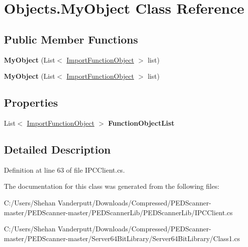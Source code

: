 \hypertarget{class_objects_1_1_my_object}{}\section{Objects.\+My\+Object Class Reference}
\label{class_objects_1_1_my_object}
\subsection*{Public Member Functions}
\begin{DoxyCompactItemize}
\item 
\mbox{\label{class_objects_1_1_my_object_a3b745d678a467607738e0a4b5d677e44}} 
{\bfseries My\+Object} (List$<$ \mbox{\hyperlink{class_objects_1_1_import_function_object}{Import\+Function\+Object}} $>$ list)
\item 
\mbox{\label{class_objects_1_1_my_object_a3b745d678a467607738e0a4b5d677e44}} 
{\bfseries My\+Object} (List$<$ \mbox{\hyperlink{class_objects_1_1_import_function_object}{Import\+Function\+Object}} $>$ list)
\end{DoxyCompactItemize}
\subsection*{Properties}
\begin{DoxyCompactItemize}
\item 
\mbox{\label{class_objects_1_1_my_object_a0af5a42cf0a47c368cd6a39bb3d6dcc8}} 
List$<$ \mbox{\hyperlink{class_objects_1_1_import_function_object}{Import\+Function\+Object}} $>$ {\bfseries Function\+Object\+List}
\end{DoxyCompactItemize}


\subsection{Detailed Description}


Definition at line 63 of file I\+P\+C\+Client.\+cs.



The documentation for this class was generated from the following files\+:\begin{DoxyCompactItemize}
\item 
C\+:/\+Users/\+Shehan Vanderputt/\+Downloads/\+Compressed/\+P\+E\+D\+Scanner-\/master/\+P\+E\+D\+Scanner-\/master/\+P\+E\+D\+Scanner\+Lib/\+P\+E\+D\+Scanner\+Lib/I\+P\+C\+Client.\+cs\item 
C\+:/\+Users/\+Shehan Vanderputt/\+Downloads/\+Compressed/\+P\+E\+D\+Scanner-\/master/\+P\+E\+D\+Scanner-\/master/\+Server64\+Bit\+Library/\+Server64\+Bit\+Library/Class1.\+cs\end{DoxyCompactItemize}

